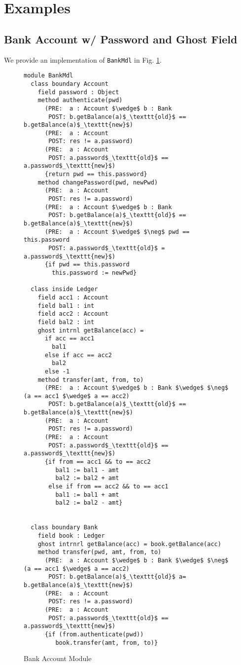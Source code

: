 \newpage

\section{Examples}
\label{s:examples}

\subsection{Bank Account w/ Password and Ghost Field}
We provide an implementation of \texttt{BankMdl} in Fig. \ref{f:ex-bank}.
\begin{figure}[t]
\begin{lstlisting}[mathescape=true, frame=lines]
module BankMdl
  class boundary Account
    field password : Object
    method authenticate(pwd)
      (PRE:  a : Account $\wedge$ b : Bank
       POST: b.getBalance(a)$_\texttt{old}$ == b.getBalance(a)$_\texttt{new}$)
      (PRE:  a : Account
       POST: res != a.password)
      (PRE:  a : Account
       POST: a.password$_\texttt{old}$ == a.password$_\texttt{new}$)
      {return pwd == this.password}
    method changePassword(pwd, newPwd)
      (PRE:  a : Account
       POST: res != a.password)
      (PRE:  a : Account $\wedge$ b : Bank
       POST: b.getBalance(a)$_\texttt{old}$ == b.getBalance(a)$_\texttt{new}$)
      (PRE:  a : Account $\wedge$ $\neg$ pwd == this.password
       POST: a.password$_\texttt{old}$ = a.password$_\texttt{new}$)
      {if pwd == this.password
        this.password := newPwd}

  class inside Ledger
    field acc1 : Account
    field bal1 : int
    field acc2 : Account
    field bal2 : int
    ghost intrnl getBalance(acc) = 
      if acc == acc1
        bal1
      else if acc == acc2
        bal2
      else -1
    method transfer(amt, from, to)
      (PRE:  a : Account $\wedge$ b : Bank $\wedge$ $\neg$ (a == acc1 $\wedge$ a == acc2)
       POST: b.getBalance(a)$_\texttt{old}$ == b.getBalance(a)$_\texttt{new}$)
      (PRE:  a : Account
       POST: res != a.password)
      (PRE:  a : Account
       POST: a.password$_\texttt{old}$ == a.password$_\texttt{new}$)
      {if from == acc1 && to == acc2
         bal1 := bal1 - amt
         bal2 := bal2 + amt
       else if from == acc2 && to == acc1
         bal1 := bal1 + amt
         bal2 := bal2 - amt}
      

  class boundary Bank
    field book : Ledger
    ghost intrnrl getBalance(acc) = book.getBalance(acc)
    method transfer(pwd, amt, from, to)
      (PRE:  a : Account $\wedge$ b : Bank $\wedge$ $\neg$ (a == acc1 $\wedge$ a == acc2)
       POST: b.getBalance(a)$_\texttt{old}$ a= b.getBalance(a)$_\texttt{new}$)
      (PRE:  a : Account
       POST: res != a.password)
      (PRE:  a : Account
       POST: a.password$_\texttt{old}$ == a.password$_\texttt{new}$)
      {if (from.authenticate(pwd))
         book.transfer(amt, from, to)}
\end{lstlisting}
\caption{Bank Account Module}
\label{f:ex-bank}
\end{figure}
